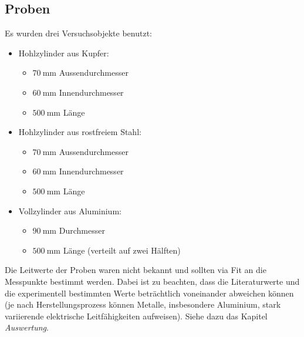 \clearpage
\subsection{Proben}
\label{sec:durchf:subsec:proben}


Es wurden drei Versuchsobjekte benutzt:
\begin{itemize}
    \item
        Hohlzylinder aus Kupfer:
        \begin{itemize}
            \item
                $\SI{70}{\milli\meter}$ Aussendurchmesser
            \item
                $\SI{60}{\milli\meter}$ Innendurchmesser
            \item
                $\SI{500}{\milli\meter}$ L\"ange
        \end{itemize}
    \item
        Hohlzylinder aus rostfreiem Stahl:
        \begin{itemize}
            \item
                $\SI{70}{\milli\meter}$ Aussendurchmesser
            \item
                $\SI{60}{\milli\meter}$ Innendurchmesser
            \item
                $\SI{500}{\milli\meter}$ L\"ange
        \end{itemize}
    \item
        Vollzylinder aus Aluminium:
        \begin{itemize}
            \item
                $\SI{90}{\milli\meter}$ Durchmesser
            \item
                $\SI{500}{\milli\meter}$ L\"ange (verteilt auf zwei H\"alften)
        \end{itemize}
\end{itemize}


Die  Leitwerte der  Proben waren  nicht  bekannt und  sollten via  Fit an  die
Messpunkte  bestimmt werden. Dabei  ist zu  beachten, dass  die Literaturwerte
und die  experimentell bestimmten  Werte betr\"achtlich  voneinander abweichen
k\"onnen   (je  nach   Herstellungsprozess   k\"onnen  Metalle,   insbesondere
Aluminium, stark  variierende elektrische  Leitf\"ahigkeiten aufweisen). Siehe
dazu das Kapitel \emph{Auswertung}.


